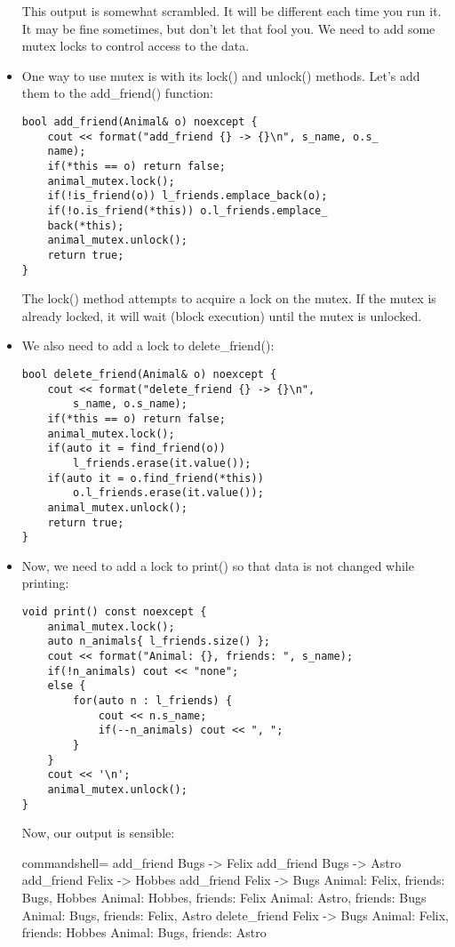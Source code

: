 \begin{itemize}
This output is somewhat scrambled. It will be different each time you run it. It may be fine sometimes, but don't let that fool you. We need to add some mutex locks to control access to the data.

\item 
One way to use mutex is with its lock() and unlock() methods. Let's add them to the add\_friend() function:

\begin{lstlisting}[style=styleCXX]
bool add_friend(Animal& o) noexcept {
	cout << format("add_friend {} -> {}\n", s_name, o.s_
	name);
	if(*this == o) return false;
	animal_mutex.lock();
	if(!is_friend(o)) l_friends.emplace_back(o);
	if(!o.is_friend(*this)) o.l_friends.emplace_
	back(*this);
	animal_mutex.unlock();
	return true;
}
\end{lstlisting}

The lock() method attempts to acquire a lock on the mutex. If the mutex is already locked, it will wait (block execution) until the mutex is unlocked.

\item 
We also need to add a lock to delete\_friend():

\begin{lstlisting}[style=styleCXX]
bool delete_friend(Animal& o) noexcept {
	cout << format("delete_friend {} -> {}\n",
		s_name, o.s_name);
	if(*this == o) return false;
	animal_mutex.lock();
	if(auto it = find_friend(o))
		l_friends.erase(it.value());
	if(auto it = o.find_friend(*this))
		o.l_friends.erase(it.value());
	animal_mutex.unlock();
	return true;
}
\end{lstlisting}

\item 
Now, we need to add a lock to print() so that data is not changed while printing:

\begin{lstlisting}[style=styleCXX]
void print() const noexcept {
	animal_mutex.lock();
	auto n_animals{ l_friends.size() };
	cout << format("Animal: {}, friends: ", s_name);
	if(!n_animals) cout << "none";
	else {
		for(auto n : l_friends) {
			cout << n.s_name;
			if(--n_animals) cout << ", ";
		}
	}
	cout << '\n';
	animal_mutex.unlock();
}
\end{lstlisting}

Now, our output is sensible:

\begin{tcblisting}{commandshell={}}
add_friend Bugs -> Felix
add_friend Bugs -> Astro
add_friend Felix -> Hobbes
add_friend Felix -> Bugs
Animal: Felix, friends: Bugs, Hobbes
Animal: Hobbes, friends: Felix
Animal: Astro, friends: Bugs
Animal: Bugs, friends: Felix, Astro
delete_friend Felix -> Bugs
Animal: Felix, friends: Hobbes
Animal: Bugs, friends: Astro
\end{tcblisting}


\end{itemize}
